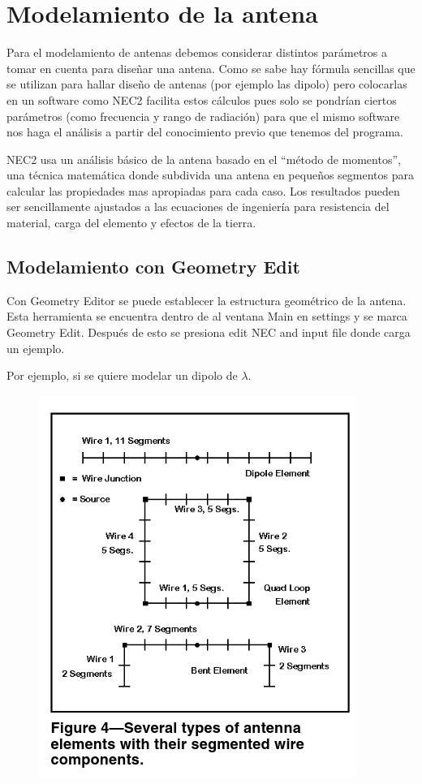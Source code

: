 \documentclass[12pt]{article}
\begin{document}
\section{Modelamiento de la antena}

Para el modelamiento de antenas debemos considerar distintos par\'ametros a tomar
en cuenta para diseñar una antena. Como se sabe hay fórmula sencillas que se
utilizan para hallar diseño de antenas (por ejemplo las dipolo) pero colocarlas
en un software como NEC2 facilita estos c\'alculos pues solo se pondrían ciertos
par\'ametros (como frecuencia y rango de radiación) para que el mismo software
nos haga el an\'alisis a partir del conocimiento previo que tenemos del programa.

NEC2 usa un an\'alisis b\'asico de la antena basado en el ``método de momentos'',
una técnica matem\'atica donde subdivida una antena en pequeños segmentos para
calcular las propiedades mas apropiadas para cada caso. Los resultados pueden
ser sencillamente ajustados a las ecuaciones de ingeniería para resistencia del
material, carga del elemento y efectos de la tierra. 

\subsection{Modelamiento con Geometry Edit}

Con Geometry Editor se puede establecer la estructura geométrico de la antena.
Esta herramienta se encuentra dentro de al ventana Main en settings y se marca
Geometry Edit. Después de esto se presiona edit NEC and input file donde carga
un ejemplo.

Por ejemplo, si se quiere modelar un dipolo de $\lambda$.

\begin{figure}[H]
\centering
\includegraphics[width=.4\linewidth]{images/Captura_de_pantalla_de_2021-09-12_23-21-26.png}
\end{figure}
\end{document}
